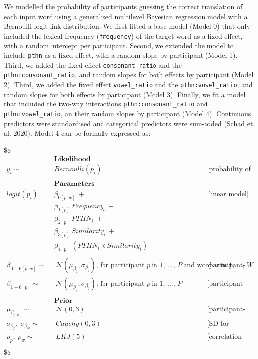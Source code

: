 \documentclass[
  man]{apa6}
\begin{document}
We modelled the probability of participants guessing the correct
translation of each input word using a generalised multilevel Bayesian
regression model with a Bernoulli logit link distribution. We first
fitted a base model (Model 0) that only included the lexical frequency
(\texttt{frequency}) of the target word as a fixed effect, with a random
intercept per participant. Second, we extended the model to include
\texttt{pthn} as a fixed effect, with a random slope by participant
(Model 1). Third, we added the fixed effect \texttt{consonant\_ratio}
and the \texttt{pthn:consonant\_ratio}, and random slopes for both
effects by participant (Model 2). Third, we added the fixed effect
\texttt{vowel\_ratio} and the \texttt{pthn:vowel\_ratio}, and random
slopes for both effects by participant (Model 3). Finally, we fit a
model that included the two-way interactions
\texttt{pthn:consonant\_ratio} and \texttt{pthn:vowel\_ratio}, an their
random slopes by participant (Model 4). Continuous predictors were
standardised and categorical predictors were sum-coded (Schad et al.
2020). Model 4 can be formally expressed as:

\$\$ \begin{align*}

&\textbf{Likelihood}  \\
y_{i} \sim& Bernoulli(p_{i}) && \text{[probability of correct translation]} \\ \\

&\textbf{Parameters}  \\

logit(p_{i}) = ~ &  \beta_{0[p,w]} ~ +  && \text{[linear model]}\\
& \beta_{1[p]} ~ Frequency_{i} ~ + \\
& \beta_{2[p]} ~ PTHN_i ~ + \\
& \beta_{3[p]} ~ Similarity_i ~ + \\
& \beta_{4[p]} ~ (PTHN_i \times Similarity_i) \\ \\

\beta_{0-6[p,w]} \sim& ~  \mathcal{N}(\mu_{\beta_{j}}, \sigma_{\beta_{j}}) \text{, for participant } p ~\text{in 1, ..., } P ~\text{and  word } w ~\text{in 1, ..., } W && \text{[participant- and word-level intercepts]} \\
\beta_{1-6[p]} \sim& ~  \mathcal{N}(\mu_{\beta_{j}}, \sigma_{\beta_{j}}) \text{, for participant } p ~\text{in 1, ..., } P
&& \text{[participant-level coefficients]} \\ \\

&\textbf{Prior}  \\

\mu_{\beta_{p,w}} ~ \sim& ~ \mathcal{N}(0, 3) && \text{[participant-level coefficients]} \\
\sigma_{\beta_{p}}, ~ \sigma_{\beta_{w}} \sim& ~ Cauchy(0, 3) && \text{[SD for population and participant]} \\
\rho_{p}, ~ \rho_{w} \sim& ~LKJ(5) && \text{[correlation between participant-level coefficients]} \\


\end{align*} \$\$
\end{document}
